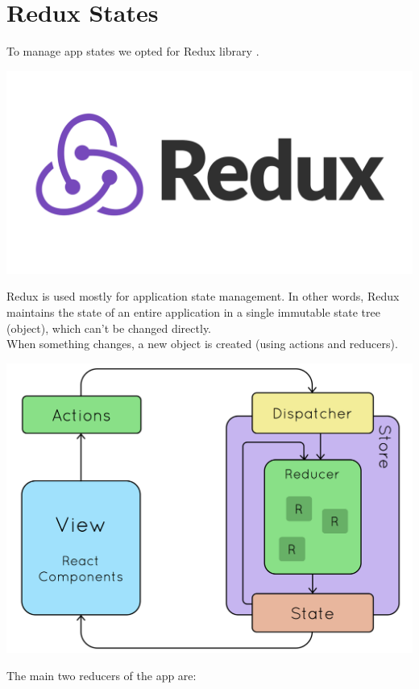 \documentclass[12pt,hidelinks]{article}
\begin{document}
\section{Redux States}
\vspace{10.5cm}
To manage app states we opted for Redux library \cite{Redux}.
\begin{center}
	\includegraphics[scale=0.2]{redux-logo}
\end{center}
Redux is used mostly for application state management. 
In other words, Redux maintains the state of an entire application in a single immutable state tree (object), which can't be changed directly.\\
When something changes, a new object is created (using actions and reducers).
\begin{center}
	\includegraphics[scale=0.25]{Redux-workflow}
\end{center}
The main two reducers of the app are:
\end{document}
